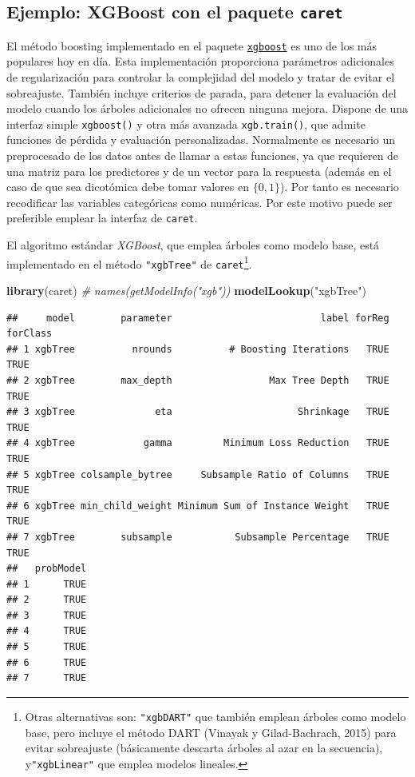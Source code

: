 \documentclass[
]{book}
\newenvironment{Shaded}{\begin{snugshade}}{\end{snugshade}}
\newcommand{\CommentTok}[1]{\textcolor[rgb]{0.56,0.35,0.01}{\textit{#1}}}
\newcommand{\KeywordTok}[1]{\textcolor[rgb]{0.13,0.29,0.53}{\textbf{#1}}}
\newcommand{\NormalTok}[1]{#1}
\newcommand{\StringTok}[1]{\textcolor[rgb]{0.31,0.60,0.02}{#1}}
\theoremstyle{break}
\theoremstyle{definition}
\theoremstyle{definition}
\theoremstyle{definition}
\theoremstyle{remark}
\begin{document}
\hypertarget{ejemplo-xgboost-con-el-paquete-caret}{%
\subsection{\texorpdfstring{Ejemplo: XGBoost con el paquete \texttt{caret}}{Ejemplo: XGBoost con el paquete caret}}\label{ejemplo-xgboost-con-el-paquete-caret}}

El método boosting implementado en el paquete \href{https://github.com/dmlc/xgboost/tree/master/R-package}{\texttt{xgboost}} es uno de los más populares hoy en día.
Esta implementación proporciona parámetros adicionales de regularización para controlar la complejidad del modelo y tratar de evitar el sobreajuste.
También incluye criterios de parada, para detener la evaluación del modelo cuando los árboles adicionales no ofrecen ninguna mejora.
Dispone de una interfaz simple \texttt{xgboost()} y otra más avanzada \texttt{xgb.train()}, que admite funciones de pérdida y evaluación personalizadas.
Normalmente es necesario un preprocesado de los datos antes de llamar a estas funciones, ya que requieren de una matriz para los predictores y de un vector para la respuesta (además en el caso de que sea dicotómica debe tomar valores en \(\{0, 1\}\)). Por tanto es necesario recodificar las variables categóricas como numéricas.
Por este motivo puede ser preferible emplear la interfaz de \texttt{caret}.

El algoritmo estándar \emph{XGBoost}, que emplea árboles como modelo base, está implementado en el método \texttt{"xgbTree"} de \texttt{caret}\footnote{Otras alternativas son: \texttt{"xgbDART"} que también emplean árboles como modelo base, pero incluye el método DART (Vinayak y Gilad-Bachrach, 2015) para evitar sobreajuste (básicamente descarta árboles al azar en la secuencia), y\texttt{"xgbLinear"} que emplea modelos lineales.}.

\begin{Shaded}
\begin{Highlighting}[]
\KeywordTok{library}\NormalTok{(caret)}
\CommentTok{# names(getModelInfo("xgb"))}
\KeywordTok{modelLookup}\NormalTok{(}\StringTok{"xgbTree"}\NormalTok{)}
\end{Highlighting}
\end{Shaded}

\begin{verbatim}
##     model        parameter                          label forReg forClass
## 1 xgbTree          nrounds          # Boosting Iterations   TRUE     TRUE
## 2 xgbTree        max_depth                 Max Tree Depth   TRUE     TRUE
## 3 xgbTree              eta                      Shrinkage   TRUE     TRUE
## 4 xgbTree            gamma         Minimum Loss Reduction   TRUE     TRUE
## 5 xgbTree colsample_bytree     Subsample Ratio of Columns   TRUE     TRUE
## 6 xgbTree min_child_weight Minimum Sum of Instance Weight   TRUE     TRUE
## 7 xgbTree        subsample           Subsample Percentage   TRUE     TRUE
##   probModel
## 1      TRUE
## 2      TRUE
## 3      TRUE
## 4      TRUE
## 5      TRUE
## 6      TRUE
## 7      TRUE
\end{verbatim}
\end{document}
